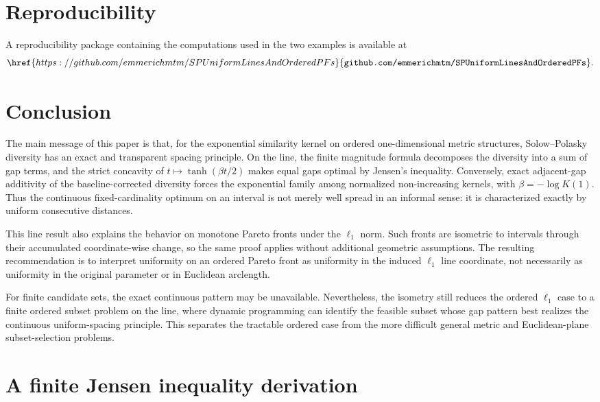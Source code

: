 \documentclass[12pt,a4paper]{article}
\begin{document}
\section{Reproducibility}
\label{sec:reproducibility}

A reproducibility package containing the computations used in the two examples is available at
\[
\href{https://github.com/emmerichmtm/SPUniformLinesAndOrderedPFs}{\texttt{github.com/emmerichmtm/SPUniformLinesAndOrderedPFs}}.
\]
\section{Conclusion}

The main message of this paper is that, for the exponential similarity kernel on ordered one-dimensional metric structures, Solow--Polasky diversity has an exact and transparent spacing principle.  On the line, the finite magnitude formula decomposes the diversity into a sum of gap terms, and the strict concavity of $t\mapsto \tanh(\beta t/2)$ makes equal gaps optimal by Jensen's inequality.  Conversely, exact adjacent-gap additivity of the baseline-corrected diversity forces the exponential family among normalized non-increasing kernels, with $\beta=-\log K(1)$.  Thus the continuous fixed-cardinality optimum on an interval is not merely well spread in an informal sense: it is characterized exactly by uniform consecutive distances.

This line result also explains the behavior on monotone Pareto fronts under the $\ell_1$ norm.  Such fronts are isometric to intervals through their accumulated coordinate-wise change, so the same proof applies without additional geometric assumptions.  The resulting recommendation is to interpret uniformity on an ordered Pareto front as uniformity in the induced $\ell_1$ line coordinate, not necessarily as uniformity in the original parameter or in Euclidean arclength.

For finite candidate sets, the exact continuous pattern may be unavailable.  Nevertheless, the isometry still reduces the ordered $\ell_1$ case to a finite ordered subset problem on the line, where dynamic programming can identify the feasible subset whose gap pattern best realizes the continuous uniform-spacing principle.  This separates the tractable ordered case from the more difficult general metric and Euclidean-plane subset-selection problems.

\appendix
\section{A finite Jensen inequality derivation}
\label{app:jensen}
\end{document}
